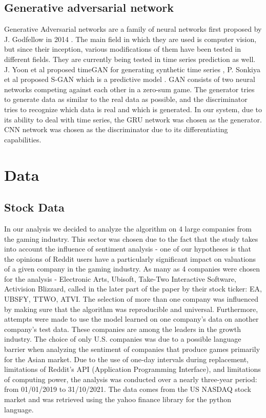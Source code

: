 \documentclass[11pt]{article} %
\begin{document}
\subsection{Generative adversarial network}
Generative Adversarial networks are a family of neural networks first proposed by J. Godfellow in 2014 \cite{gan1}. The main field in which they are used is computer vision, but since their inception, various modifications of them have been tested in different fields. They are currently being tested in time series prediction as well. J. Yoon et al proposed timeGAN for generating synthetic time series  \cite{time-gan},  P. Sonkiya et al proposed S-GAN which is a predictive model \cite{s-gan}. GAN consists of two neural networks competing against each other in a zero-sum game. The generator tries to generate data as similar to the real data as possible, and the discriminator tries to recognize which data is real and which is generated. In our system, due to its ability to deal with time series, the GRU network was chosen as the generator. CNN network was chosen as the discriminator due to its differentiating capabilities. 

\section{Data}
\subsection{Stock Data}
In our analysis we decided to analyze the algorithm on 4 large companies from the gaming industry. This sector was chosen due to the fact that the study takes into account the influence of sentiment analysis - one of our hypotheses is that the opinions of Reddit users have a particularly significant impact on valuations of a given company in the gaming industry. As many as 4 companies were chosen for the analysis - Electronic Arts, Ubisoft, Take-Two Interactive Software, Activision Blizzard, called in the later part of the paper by their stock ticker: EA, UBSFY, TTWO, ATVI.  The selection of more than one company was influenced by making sure that the algorithm was reproducible and universal. Furthermore, attempts were made to use the model learned on one company's data on another company's test data. These companies are among the leaders in the growth industry. The choice of only U.S. companies was due to a possible language barrier when analyzing the sentiment of companies that produce games primarily for the Asian market. Due to the use of one-day intervals during replacement, limitations of Reddit's API (Application Programming Interface), and limitations of computing power, the analysis was conducted over a nearly three-year period: from 01/01/2019 to 31/10/2021. The data comes from the US NASDAQ stock market and was retrieved using the yahoo finance library for the python language. 
\end{document}
